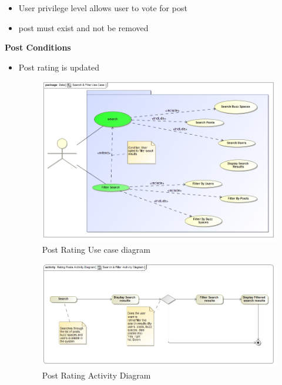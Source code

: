 \documentclass[11pt]{article}
\begin{document}
\begin{enumerate}
\begin{itemize}
\begin{itemize}
	  \item User privilege level allows user to vote for post
	  \item post must exist and not be removed
	  \end{itemize}
	  \textbf{Post Conditions}
	  \begin{itemize}
	  \item Post rating is updated
	  
	  \graphicspath{ {../Diagrams/Sphe/PostRatings/} }
	  \begin{figure}[H]	
    	\includegraphics[scale=0.5]{UseCase.jpg}
    	\caption{Post Rating Use case diagram}
    	
    	
	\end{figure}
	\graphicspath{ {../Diagrams/Sphe/PostRatings/} }
	  \begin{figure}[H]	
    	\includegraphics[scale=0.5]{ActivityDiagram.jpg}
    	\caption{Post Rating Activity Diagram}
	\end{figure}
	
	 
	  \end{itemize}
	  \end{itemize}


\end{enumerate}
\end{document}
